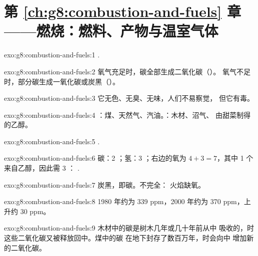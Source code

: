 \section*{第 \ref{ch:g8:combustion-and-fuels} 章——燃烧：燃料、产物与温室气体}

\begin{solution}{exo:g8:combustion-and-fuels:1}
.
\end{solution}

\begin{solution}{exo:g8:combustion-and-fuels:2}
氧气充足时，碳全部生成二氧化碳（）。
氧气不足时，部分碳生成一氧化碳或炭黑（）。
\end{solution}

\begin{solution}{exo:g8:combustion-and-fuels:3}
它无色、无臭、无味，人们不易察觉，
但它有毒。
\end{solution}

\begin{solution}{exo:g8:combustion-and-fuels:4}
：煤、天然气、汽油。：木材、沼气、
由甜菜制得的乙醇。
\end{solution}

\begin{solution}{exo:g8:combustion-and-fuels:5}
.
\end{solution}

\begin{solution}{exo:g8:combustion-and-fuels:6}
碳：2 ；氢：3 ；右边的氧为 $4 + 3 =
7$，其中 1 个来自乙醇，因此需 3 ：
.
\end{solution}

\begin{solution}{exo:g8:combustion-and-fuels:7}
炭黑，即碳。不完全：
火焰缺氧。
\end{solution}

\begin{solution}{exo:g8:combustion-and-fuels:8}
1980 年约为 339 ppm，2000 年约为 370 ppm，上升约 30 ppm。
\end{solution}

\begin{solution}{exo:g8:combustion-and-fuels:9}
木材中的碳是树木几年或几十年前从中
吸收的，时这些二氧化碳又被释放回中。煤中的碳
在地下封存了数百万年，时会向中
增加新的二氧化碳。
\end{solution}

